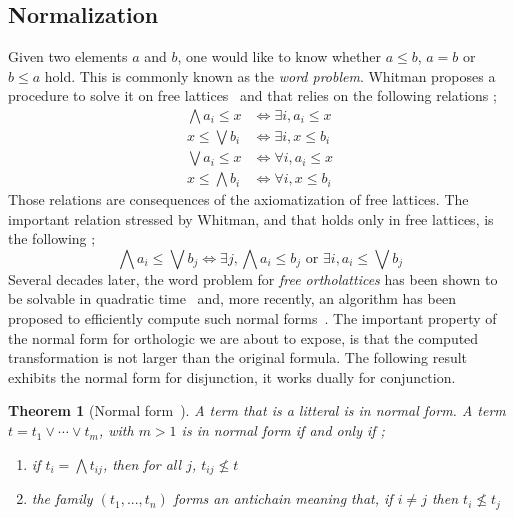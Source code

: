 \documentclass[a4paper, 11pt]{article}
\newtheorem{theorem}{Theorem}
\begin{document}
    \subsection{Normalization}
    Given two elements $a$ and $b$, one would like to know whether $a\leq b$, $a=b$ or 
    $b\leq a$ hold. This is commonly known as the \textit{word problem}. Whitman proposes a procedure to
    solve it on free lattices~\cite{43df3167-5a81-387d-88d7-2d29cdf1c881} and that relies on
    the following relations ;
    \begin{align}
	    \bigwedge a_i\leq x&\Leftrightarrow\exists i,a_i\leq x\\
	    x\leq\bigvee b_i&\Leftrightarrow\exists i,x\leq b_i\\
	    \bigvee a_i\leq x&\Leftrightarrow\forall i,a_i\leq x\\
	    x\leq\bigwedge b_i&\Leftrightarrow\forall i,x\leq b_i
    \end{align}
    Those relations are consequences of the axiomatization of free lattices. The important relation
    stressed by Whitman, and that holds only in free lattices, is the following ;
    \[
	    \bigwedge a_i\leq\bigvee b_j\Leftrightarrow\exists j,\bigwedge a_i\leq b_j\text{ or }
	    \exists i,a_i\leq\bigvee b_j
    \]
    Several decades later, the word problem for \textit{free ortholattices} has been shown to be 
    solvable in quadratic time~\cite{Bruns_1976} and, more recently, an algorithm has 
    been proposed to efficiently compute such normal forms~\cite{10.1007/978-3-031-37709-9_19}. The
    important property of the normal form for orthologic we are about to expose, is that the
    computed transformation is not larger than the original formula. The following result exhibits
    the normal form for disjunction, it works dually for conjunction.
    \begin{theorem}[Normal form~\cite{free_lattices_ams}]
	    A term that is a litteral is in normal form. A term $t=t_1\vee\cdots\vee t_m$, with $m>1$ 
	    is in normal form if and only if ;
    \begin{enumerate}
	    \item
		    if $t_i=\bigwedge t_{ij}$, then for all $j$, $t_{ij}\not\leq t$
	    \item
		    the family $(t_1,...,t_n)$ forms an antichain meaning that, if $i\neq j$ then 
		    $t_i\not\leq t_j$
    \end{enumerate} 
    \end{theorem}
\end{document}
